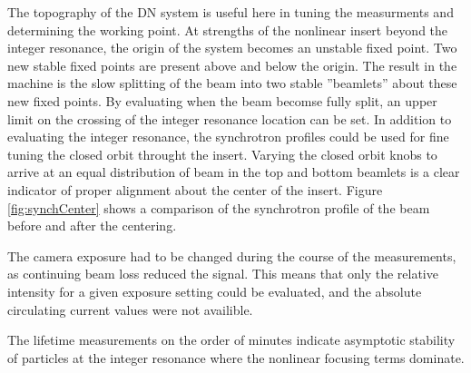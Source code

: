The topography of the DN system is useful here in tuning the measurments and determining the working point. At strengths of the nonlinear insert beyond the integer resonance, the origin of the system becomes an unstable fixed point. Two new stable fixed points are present above and below the origin. The result in the machine is the slow splitting of the beam into two stable ”beamlets” about these new fixed points. By evaluating when the beam becomse fully split, an upper limit on the crossing of the integer resonance location can be set. In addition to evaluating the integer resonance, the synchrotron profiles could be used for fine tuning the closed orbit throught the insert. Varying the closed orbit knobs to arrive at an equal distribution of beam in the top and bottom beamlets is a  clear indicator of proper alignment about the center of the insert. Figure \ref{fig:synchCenter} shows a comparison of the synchrotron profile of the beam before and after the centering.

The camera exposure had to be changed during the course of the measurements, as continuing beam loss reduced the signal. This means that only the relative intensity for a given exposure setting could be evaluated, and the absolute circulating current values were not availible. 

The lifetime measurements on the order of minutes indicate asymptotic stability of particles at the integer resonance where the nonlinear focusing terms dominate.
